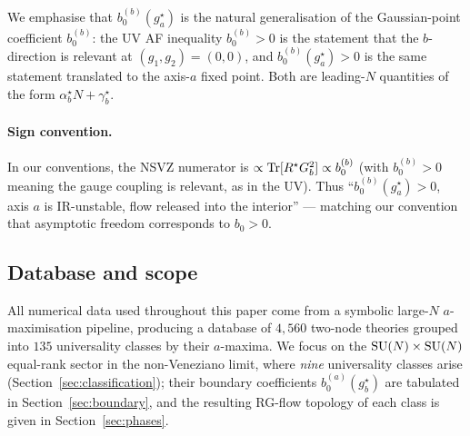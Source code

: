 We emphasise that $b_{0}^{(b)}(g_{a}^{\star})$ is the natural
generalisation of the Gaussian-point coefficient $b_{0}^{(b)}$:
the UV AF inequality $b_{0}^{(b)}>0$ is the statement that the
$b$-direction is relevant at $(g_{1},g_{2})=(0,0)$, and
$b_{0}^{(b)}(g_{a}^{\star})>0$ is the same statement translated to
the axis-$a$ fixed point.  Both are leading-$N$ quantities of the form
$\alpha_{b}^{\star} N + \gamma_{b}^{\star}$.

\paragraph{Sign convention.}  In our conventions, the NSVZ
numerator is $\propto \operatorname{Tr}[R^{\star} G_{b}^{2}]\propto b_{0}^{(b)}$
(with $b_{0}^{(b)}>0$ meaning the gauge coupling is relevant, as in the
UV).  Thus ``$b_{0}^{(b)}(g_{a}^{\star})>0$, axis $a$ is IR-unstable,
flow released into the interior'' — matching our convention that
asymptotic freedom corresponds to $b_{0}>0$.

\subsection{Database and scope}
\label{sec:setup-scope}

All numerical data used throughout this paper come from a symbolic
large-$N$ $a$-maximisation pipeline, producing a database of $4{,}560$
two-node theories grouped into $135$ universality classes by their
$a$-maxima.  We focus on the $\mathrm{SU}(N)\times\mathrm{SU}(N)$ equal-rank sector in
the non-Veneziano limit, where \emph{nine} universality classes arise
(Section~\ref{sec:classification}); their boundary coefficients
$b_{0}^{(a)}(g_{b}^{\star})$ are tabulated in
Section~\ref{sec:boundary}, and the resulting RG-flow topology of each
class is given in Section~\ref{sec:phases}.
